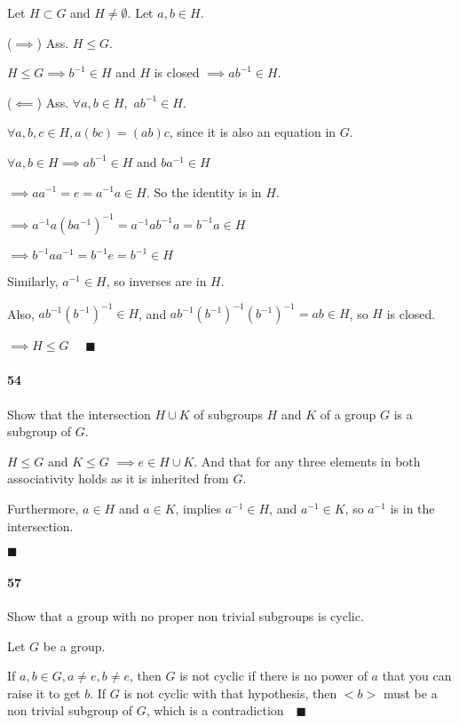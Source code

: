 \documentclass{article}
\begin{document}
Let $H\subset G$ and $H\neq \emptyset$. Let $a,b \in H$.

($\implies$) Ass. $H\leq G$.

$H\leq G \implies b^{-1}\in H$ and $H$ is closed $\implies ab^{-1}\in H$.

($\impliedby$) Ass. $\forall a,b \in H,$ $ab^{-1}\in H$.

$\forall a,b,c \in H, a(bc) = (ab)c$, since it is also an equation in
$G$.

$\forall a,b \in H \implies ab^{-1}\in H$ and $ba^{-1} \in H$

$\implies  aa^{-1} = e = a^{-1}a \in H$. So the identity is in $H$.

$\implies a^{-1}a(ba^{-1})^{-1} = a^{-1}ab^{-1}a = b^{-1}a \in H$

$\implies b^{-1}aa^{-1} = b^{-1}e= b^{-1} \in H$

Similarly, $a^{-1} \in H$, so inverses are in $H$.

Also, $ab^{-1}(b^{-1})^{-1} \in H$, and
$ab^{-1}(b^{-1})^{-1}(b^{-1})^{-1} = ab \in H$, so $H$ is closed.

$\implies H\leq G$
$\quad \blacksquare$

\newpage
\paragraph{54} Show that the intersection $H\cup K$ of subgroups $H$ and $K$ of a
group $G$ is a subgroup of $G$.


$H\leq G$ and $K\leq G$ $\implies e\in H\cup K$. And that for any
three elements in both associativity holds as it is inherited from
$G$.

Furthermore, $a\in H$ and $a\in K$, implies $a^{-1} \in H$, and
$a^{-1}\in K$, so $a^{-1}$ is in the intersection.

$\blacksquare$

\paragraph{57} Show that a group with no proper non trivial subgroups
is cyclic.

Let $G$ be a group.

If $a,b\in G, a\neq e, b\neq e$, then $G$ is not cyclic if there is no
power of $a$ that you can raise it to get $b$. If $G$ is not cyclic
with that hypothesis, then $<b>$ must be a non trivial subgroup of
$G$, which is a contradiction$\quad \blacksquare$
\end{document}
